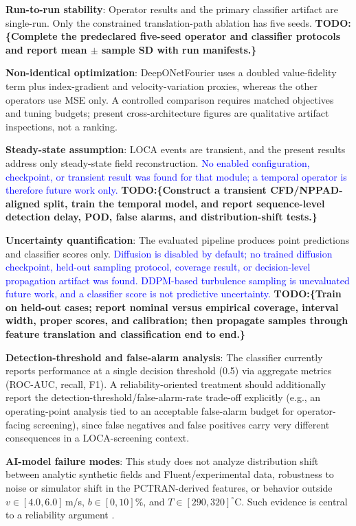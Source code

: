 \documentclass[journal]{IEEEtran}
\newcommand{\added}[1]{\textcolor{blue}{#1}}
\newcommand{\todo}[1]{\textcolor{green!50!black}{\textbf{TODO:\{#1\}}}}
\begin{document}
\textbf{Run-to-run stability}: Operator results and the primary classifier artifact are single-run. Only the constrained translation-path ablation has five seeds. \todo{Complete the predeclared five-seed operator and classifier protocols and report mean $\pm$ sample SD with run manifests.}

\textbf{Non-identical optimization}: DeepONetFourier uses a doubled value-fidelity term plus index-gradient and velocity-variation proxies, whereas the other operators use MSE only. A controlled comparison requires matched objectives and tuning budgets; present cross-architecture figures are qualitative artifact inspections, not a ranking.

\textbf{Steady-state assumption}: LOCA events are transient, and the present results address only steady-state field reconstruction.  \added{No enabled configuration, checkpoint, or transient result was found for that module; a temporal operator is therefore future work only.} \todo{Construct a transient CFD/NPPAD-aligned split, train the temporal model, and report sequence-level detection delay, POD, false alarms, and distribution-shift tests.}

\textbf{Uncertainty quantification}: The evaluated pipeline produces point predictions and classifier scores only.  \added{Diffusion is disabled by default; no trained diffusion checkpoint, held-out sampling protocol, coverage result, or decision-level propagation artifact was found. DDPM-based turbulence sampling is unevaluated future work, and a classifier score is not predictive uncertainty.} \todo{Train on held-out cases; report nominal versus empirical coverage, interval width, proper scores, and calibration; then propagate samples through feature translation and classification end to end.}

\textbf{Detection-threshold and false-alarm analysis}: The classifier currently reports performance at a single decision threshold (0.5) via aggregate metrics (ROC-AUC, recall, F1). A reliability-oriented treatment should additionally report the detection-threshold/false-alarm-rate trade-off explicitly (e.g., an operating-point analysis tied to an acceptable false-alarm budget for operator-facing screening), since false negatives and false positives carry very different consequences in a LOCA-screening context.

\textbf{AI-model failure modes}: This study does not analyze distribution shift between analytic synthetic fields and Fluent/experimental data, robustness to noise or simulator shift in the PCTRAN-derived features, or behavior outside $v\in[4.0,6.0]$\,m/s, $b\in[0,10]\%$, and $T\in[290,320]^\circ$C. Such evidence is central to a reliability argument \cite{nrc7294,trilateral2024}.
\end{document}
